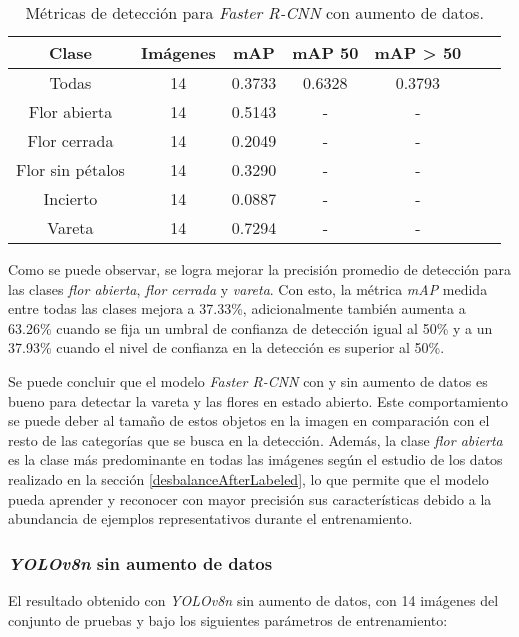 \begin{table}[h]
	\centering
	\caption{Métricas de detección para \textit{Faster R-CNN} con aumento de datos.}
	\begin{tabular}{c c c c c c c}    
		\toprule
		\textbf{Clase}&\textbf{Imágenes}&\textbf{mAP}&\textbf{mAP 50}&\textbf{mAP > 50}\\
		\midrule
		Todas & 14 & 0.3733 & 0.6328 & 0.3793\\
		Flor abierta & 14 & 0.5143 & - & - \\
		Flor cerrada & 14 & 0.2049 & - & - \\
		Flor sin pétalos & 14 & 0.3290 & - & - \\
		Incierto & 14 & 0.0887 & - & - \\
		Vareta & 14 & 0.7294 & - & - \\		
		\bottomrule
		\hline
	\end{tabular}
	\label{tab:resultadosFasterConAug}
\end{table}
\newpage
Como se puede observar, se logra mejorar la precisión promedio de detección para las clases \textit{flor abierta}, \textit{flor cerrada} y \textit{vareta}. Con esto, la métrica \textit{mAP} medida entre todas las clases mejora a 37.33\%, adicionalmente también aumenta a 63.26\% cuando se fija un umbral de confianza de detección igual al 50\% y a un 37.93\% cuando el nivel de confianza en la detección es superior al 50\%.

Se puede concluir que el modelo \textit{Faster R-CNN} con y sin aumento de datos es bueno para detectar la vareta y las flores en estado abierto. Este comportamiento se puede deber al tamaño de estos objetos en la imagen en comparación con el resto de las categorías que se busca en la detección. Además, la clase \textit{flor abierta} es la clase más predominante en todas las imágenes según el estudio de los datos realizado en la sección \ref{desbalanceAfterLabeled}, lo que permite que el modelo pueda aprender y reconocer con mayor precisión sus características debido a la abundancia de ejemplos representativos durante el entrenamiento.

\subsubsection{\textit{YOLOv8n} sin aumento de datos}

El resultado obtenido con \textit{YOLOv8n} sin aumento de datos, con 14 imágenes del conjunto de pruebas y bajo los siguientes parámetros de entrenamiento:

